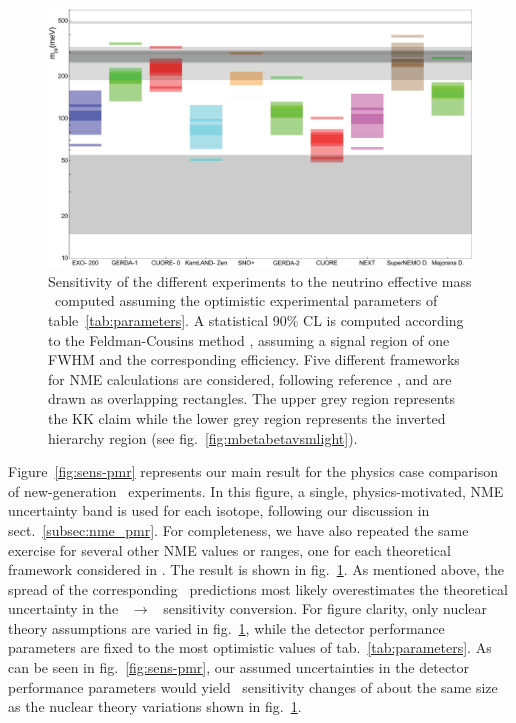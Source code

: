 \begin{figure}[ht]
\includegraphics[width=\textwidth]{img/DB_models.eps}
\caption{Sensitivity of the different experiments to the neutrino effective mass \mbb\ computed assuming the optimistic experimental parameters of table~\ref{tab:parameters}. A statistical 90\% CL is computed according to the Feldman-Cousins method \cite{Feldman:1997qc}, assuming a signal region of one FWHM and the corresponding efficiency. Five different frameworks for NME calculations are considered, following reference \cite{Dueck:2011hu}, and are drawn as overlapping rectangles. The upper grey region represents the KK claim \cite{Klapdor-Kleingrothaus:2006zcr} while the lower grey region represents the inverted hierarchy region (see fig.~\ref{fig:mbetabetavsmlight}).}
\label{fig:sens-models}
\end{figure}

Figure~\ref{fig:sens-pmr} represents our main result for the physics case comparison of new-generation \bbonu\ experiments. In this figure, a single, physics-motivated, NME uncertainty band is used for each isotope, following our discussion in sect.~\ref{subsec:nme_pmr}. For completeness, we have also repeated the same exercise for several other NME values or ranges, one for each theoretical framework considered in \cite{Dueck:2011hu}. The result is shown in fig.~\ref{fig:sens-models}. As mentioned above, the spread of the corresponding \mbb\ predictions most likely overestimates the theoretical uncertainty in the \Tonu\ $\to$ \mbb\ sensitivity conversion. For figure clarity, only nuclear theory assumptions are varied in fig.~\ref{fig:sens-models}, while the detector performance parameters are fixed to the most optimistic values of tab.~\ref{tab:parameters}. As can be seen in fig.~\ref{fig:sens-pmr}, our assumed uncertainties in the detector performance parameters would yield \mbb\ sensitivity changes of about the same size as the nuclear theory variations shown in fig.~\ref{fig:sens-models}.
